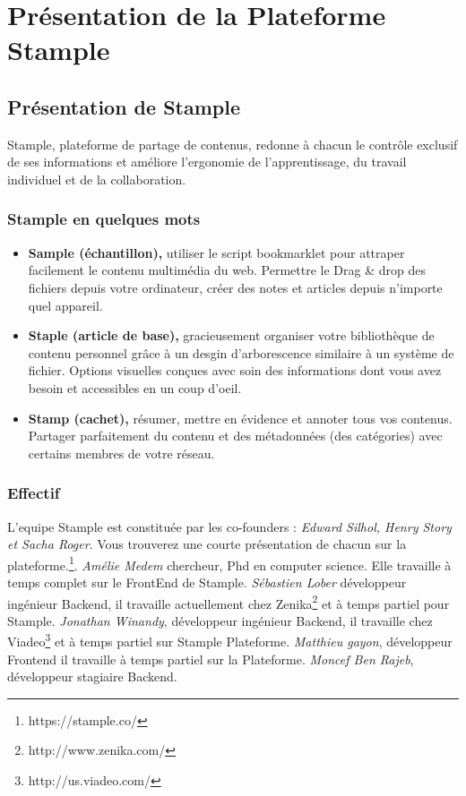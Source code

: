 \chapter{Présentation de la Plateforme Stample}
\section{Présentation de Stample}
Stample, plateforme de partage de contenus, redonne à chacun le contrôle exclusif de ses informations et améliore l'ergonomie de l'apprentissage, du travail individuel et de la collaboration.
\subsection{Stample en quelques mots}
\begin{itemize}
\item \textbf{Sample (échantillon),} utiliser le script bookmarklet pour attraper facilement le contenu multimédia du web. Permettre le Drag \& drop des fichiers depuis votre ordinateur, créer des notes et articles depuis n'importe quel appareil.
\item \textbf{Staple (article de base),} gracieusement organiser votre bibliothèque de contenu personnel grâce à un desgin d'arborescence similaire à un système de fichier.
Options visuelles conçues avec soin des informations dont vous avez besoin et accessibles en un coup d'oeil.
\item \textbf{Stamp (cachet),} résumer, mettre en évidence et annoter tous vos contenus.
Partager parfaitement du contenu et des métadonnées (des catégories) avec certains membres de votre réseau.
\end{itemize}
\newpage
\subsection{Effectif}
L'equipe Stample est constituée par les co-founders :
\textit{Edward Silhol, Henry Story et Sacha Roger}. Vous trouverez une courte présentation de chacun sur la plateforme.\footnote{https://stample.co/}.\newline
\textit{Amélie Medem} chercheur, Phd en computer science. Elle travaille à temps complet sur le FrontEnd de Stample.\newline
\textit{Sébastien Lober} développeur ingénieur Backend, il travaille actuellement chez Zenika\footnote{http://www.zenika.com/} et à temps partiel pour Stample.\newline
\textit{Jonathan Winandy}, développeur ingénieur Backend, il travaille chez Viadeo\footnote{http://us.viadeo.com/} et à temps partiel sur Stample Plateforme.\newline
\textit{Matthieu gayon}, développeur Frontend il travaille à temps partiel sur la Plateforme.\newline
\textit{Moncef Ben Rajeb}, développeur stagiaire Backend.
